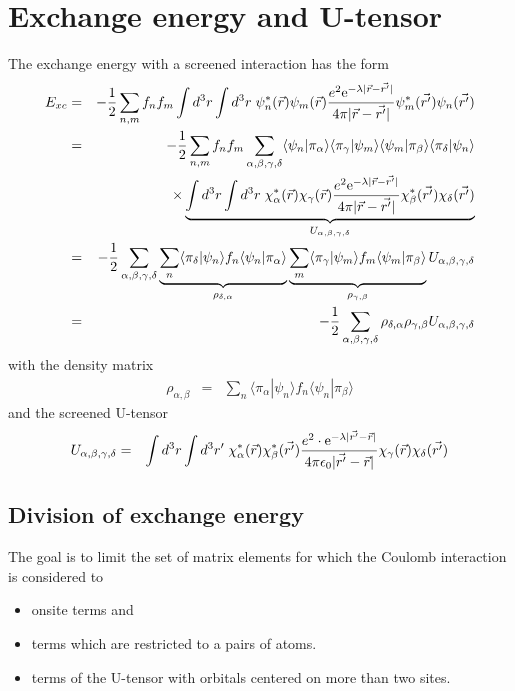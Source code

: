 \documentclass[11pt,a4paper]{report}
\begin{document}
\section{Exchange energy and U-tensor}
The exchange energy with a screened interaction has the form
\begin{eqnarray}
E_{xc}&=&-\frac{1}{2}\sum_{n,m}f_nf_m
\int d^3r\int d^3r\;
\psi^*_n(\vec{r})\psi_m(\vec{r})
\frac{e^2\e{-\lambda|\vec{r}-\vec{r'}|}}
{4\pi|\vec{r}-\vec{r'}|}
\psi^*_m(\vec{r'})\psi_n(\vec{r'})
\nonumber\\
%
%
&=&-\frac{1}{2}\sum_{n,m}f_nf_m
\sum_{\alpha,\beta,\gamma,\delta}
\langle\psi_n|\pi_\alpha\rangle
\langle\pi_\gamma|\psi_m\rangle
\langle\psi_m|\pi_\beta\rangle
\langle\pi_\delta|\psi_n\rangle
\nonumber\\
&&\times\underbrace{
\int d^3r\int d^3r\;
\chi^*_\alpha(\vec{r})\chi_\gamma(\vec{r})
\frac{e^2\e{-\lambda|\vec{r}-\vec{r'}|}}
{4\pi|\vec{r}-\vec{r'}|}
\chi^*_\beta(\vec{r'})\chi_\delta(\vec{r'})
}_{U_{\alpha,\beta,\gamma,\delta}}
\nonumber\\
%
%
&=&-\frac{1}{2}
\sum_{\alpha,\beta,\gamma,\delta}
\underbrace{
\sum_n\langle\pi_\delta|\psi_n\rangle f_n\langle\psi_n|\pi_\alpha\rangle
}_{\rho_{\delta,\alpha}}
\underbrace{
\sum_m\langle\pi_\gamma|\psi_m\rangle f_m\langle\psi_m|\pi_\beta\rangle
}_{\rho_{\gamma,\beta}}
U_{\alpha,\beta,\gamma,\delta}
\nonumber\\
%
%
&=&-\frac{1}{2}
\sum_{\alpha,\beta,\gamma,\delta}
\rho_{\delta,\alpha}\rho_{\gamma,\beta}U_{\alpha,\beta,\gamma,\delta}
\end{eqnarray}
with  the density matrix
\begin{eqnarray}
\rho_{\alpha,\beta}&=&
\sum_n\langle\pi_\alpha|\psi_n\rangle f_n\langle\psi_n|\pi_\beta\rangle
\end{eqnarray}
and the screened U-tensor
\begin{eqnarray}
U_{\alpha,\beta,\gamma,\delta}
&=&\int d^3r\int d^3r'\;
\chi^*_\alpha(\vec{r})\chi^*_\beta(\vec{r'})
\frac{e^2\cdot\mathrm{e}^{-\lambda|\vec{r'}-\vec{r}|}}{4\pi\epsilon_0|\vec{r'}-\vec{r}|}
\chi_\gamma(\vec{r})\chi_\delta(\vec{r'})
\end{eqnarray}

\subsection{Division of exchange energy}
The goal is to limit the set of matrix elements for which the Coulomb
interaction is considered to 
\begin{itemize}
\item onsite terms and 
\item terms which are restricted to a pairs of atoms.
\item terms of the U-tensor with orbitals centered on more than two
  sites.
\end{itemize}
\end{document}
